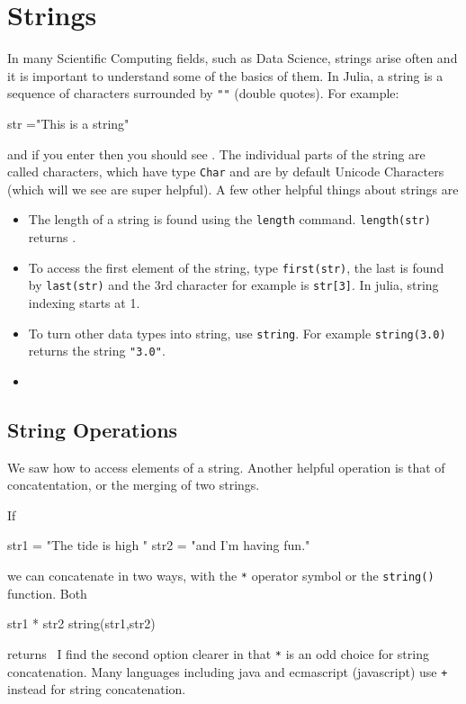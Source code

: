 \section{Strings}

In many Scientific Computing fields, such as Data Science, strings arise often and it is important to understand some of the basics of them. In Julia, a string is a sequence of characters surrounded by \verb!""! (double quotes). For example:
%
\begin{jlblock}[vars]
str ="This is a string"
\end{jlblock}
%
and if you enter  then you should see  \printpythontex[verb]. The individual parts of the string are called characters, which have type \texttt{Char} and are by default Unicode Characters (which will we see are super helpful). A few other helpful things about strings are

\begin{itemize}
\item The length of a string is found using the \texttt{length} command.  \verb!length(str)! returns  \printpythontex[verb].
\item   To access the first element of the string, type \texttt{first(str)}, the last is found by \texttt{last(str)} and the 3rd character for example is \verb!str[3]!.  In julia, string indexing starts at 1.  
\item To turn other data types into string, use \texttt{string}. For example \texttt{string(3.0)} returns the string \verb!"3.0"!.
\item \end{itemize}

\subsection{String Operations}

We saw how to access elements of a string.  Another helpful operation is that of concatentation, or the merging of two strings.  

If
\begin{jlblock}[vars]
str1 = "The tide is high "
str2 = "and I'm having fun."
\end{jlblock}
we can concatenate in two ways, with the \verb!*! operator symbol or the \verb!string()! function.  Both
\begin{jlblock}[vars]
str1 * str2 
string(str1,str2)
\end{jlblock}
%
returns  \printpythontex[verb]~I find the second option clearer in that \verb!*! is an odd choice for string concatenation.  Many languages including java and ecmascript (javascript) use \verb!+! instead for string concatenation.  

